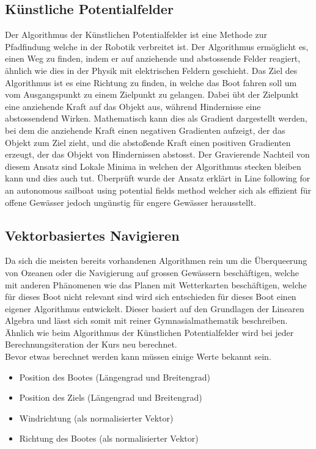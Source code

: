 \subsection{Künstliche Potentialfelder} 
Der Algorithmus der Künstlichen Potentialfelder ist eine Methode zur Pfadfindung welche in der Robotik verbreitet ist. Der Algorithmus ermöglicht es, einen Weg zu finden, indem er auf anziehende und abstossende Felder reagiert, ähnlich wie dies in der Physik mit elektrischen Feldern geschieht.
Das Ziel des Algorithmus ist es eine Richtung zu finden, in welche das Boot fahren soll um vom Ausgangspunkt zu einem Zielpunkt zu gelangen. Dabei übt der Zielpunkt eine anziehende Kraft auf das Objekt aus, während Hindernisse eine abstossendend Wirken. Mathematisch kann dies als Gradient dargestellt werden, bei dem die anziehende Kraft einen negativen Gradienten aufzeigt, der das Objekt zum Ziel zieht, und die abstoßende Kraft einen positiven Gradienten erzeugt, der das Objekt von Hindernissen abstosst.
Der Gravierende Nachteil von diesem Ansatz sind Lokale Minima in welchen der Algorithmus stecken bleiben kann und dies auch tut. Überprüft wurde der Ansatz erklärt in Line following for an autonomous sailboat using potential ﬁelds method \cite{inproceedings} welcher sich als effizient für offene Gewässer jedoch ungünstig für engere Gewässer herausstellt. 

\subsection{Vektorbasiertes Navigieren}
Da sich die meisten bereits vorhandenen Algorithmen rein um die Überqueerung von Ozeanen oder die Navigierung auf grossen Gewässern beschäftigen, welche mit anderen Phänomenen wie das Planen mit Wetterkarten beschäftigen, welche für dieses Boot nicht relevant sind wird sich entschieden für dieses Boot einen eigener Algorithmus entwickelt. Dieser basiert auf den Grundlagen der Linearen Algebra und lässt sich somit mit reiner Gymnasialmathematik beschreiben. Ähnlich wie beim Algorithmus der Künstlichen Potentialfelder wird bei jeder Berechnungsiteration der Kurs neu berechnet. \\
Bevor etwas berechnet werden kann müssen einige Werte bekannt sein. 
\begin{itemize}
    \item Position des Bootes (Längengrad und Breitengrad)
    \item Position des Ziels (Längengrad und Breitengrad)
    \item Windrichtung (als normalisierter Vektor)
    \item Richtung des Bootes (als normalisierter Vektor)
    
\end{itemize}

